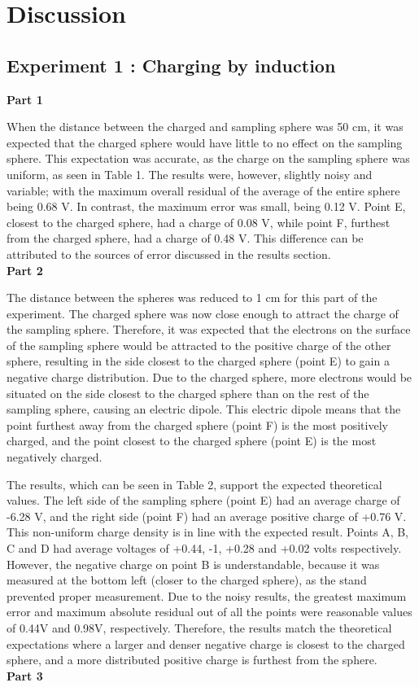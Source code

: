 \section{Discussion}

\subsection{Experiment 1 : Charging by induction}

\textbf{Part 1}

When the distance between the charged and sampling sphere was 50 cm, it was expected that the charged sphere would have little to no effect on the sampling sphere. This expectation was accurate, as the charge on the sampling sphere was uniform, as seen in Table 1. The results were, however, slightly noisy and variable; with the maximum overall residual of the average of the entire sphere being 0.68 V. In contrast, the maximum error was small, being 0.12 V. Point E, closest to the charged sphere, had a charge of 0.08 V, while point F, furthest from the charged sphere, had a charge of 0.48 V. This difference can be attributed to the sources of error discussed in the results section.\\ 
\textbf{Part 2}

The distance between the spheres was reduced to 1 cm for this part of the experiment. The charged sphere was now close enough to attract the charge of the sampling sphere. Therefore, it was expected that the electrons on the surface of the sampling sphere would be attracted to the positive charge of the other sphere, resulting in the side closest to the charged sphere (point E) to gain a negative charge distribution. Due to the charged sphere, more electrons would be situated on the side closest to the charged sphere than on the rest of the sampling sphere, causing an electric dipole. This electric dipole means that the point furthest away from the charged sphere (point F) is the most positively charged, and the point closest to the charged sphere (point E) is the most negatively charged.

The results, which can be seen in Table 2, support the expected theoretical values. The left side of the sampling sphere (point E) had an average charge of -6.28 V, and the right side (point F) had an average positive charge of +0.76 V. This non-uniform charge density is in line with the expected result. Points A, B, C and D had average voltages of +0.44, -1, +0.28 and +0.02 volts respectively. However, the negative charge on point B is understandable, because it was measured at the bottom left (closer to the charged sphere), as the stand prevented proper measurement. Due to the noisy results, the greatest maximum error and maximum absolute residual out of all the points were reasonable values of 0.44V and 0.98V, respectively. Therefore, the results match the theoretical expectations where a larger and denser negative charge is closest to the charged sphere, and a more distributed positive charge is furthest from the sphere. \\
\textbf{Part 3}

